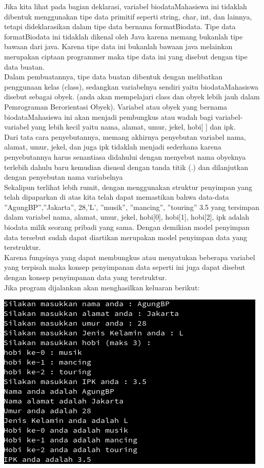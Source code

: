 \documentclass[a4paper,12pt]{article}
\begin{document}
Jika kita  lihat pada bagian deklarasi, variabel biodataMahasiswa ini tidaklah 
dibentuk menggunakan tipe data primitif seperti string, char, int, dan lainnya, tetapi  
dideklarasikan dalam tipe data bernama formatBiodata. Tipe data formatBiodata ini 
tidaklah dikenal oleh Java karena memang bukanlah tipe bawaan dari java. Karena tipe 
data ini bukanlah bawaan java melainkan merupakan ciptaan programmer maka tipe 
data ini yang disebut dengan tipe data buatan. \\
 
Dalam pembuatannya, tipe data buatan dibentuk dengan melibatkan 
penggunaan kelas (class), sedangkan variabelnya sendiri yaitu biodataMahasiswa 
disebut sebagai obyek. (anda akan mempelajari class dan obyek lebih jauh dalam 
Pemrograman Berorientasi Obyek). Variabel atau obyek yang bernama 
biodataMahasiswa ini akan menjadi pembungkus atau wadah bagi variabel-variabel 
yang lebih kecil yaitu nama, alamat, umur, jekel, hobi[ ] dan ipk.\\
Dari tata cara penyebutannya, memang akhirnya penyebutan variabel nama, 
alamat, umur, jekel, dan juga ipk tidaklah menjadi sederhana karena penyebutannya 
harus senantiasa didahului dengan menyebut nama obyeknya terlebih dahulu baru 
kemudian disusul dengan tanda titik (.) dan dilanjutkan dengan penyebutan nama variabelnya\\
Sekalipun terlihat lebih rumit, dengan menggunakan struktur penyimpan yang 
telah dipaparkan di atas kita telah dapat memastikan bahwa data-data 
”AgungBP”,”Jakarta”, 28,’L’, ”musik”, ”mancing”, ”touring” 
3.5  yang tersimpan dalam variabel nama, alamat, umur, jekel, 
hobi[0], hobi[1], hobi[2], ipk adalah biodata milik seorang pribadi yang 
sama. Dengan demikian model penyimpan data tersebut sudah dapat diartikan 
merupakan model penyimpan data yang terstruktur.\\ 
Karena fungsinya yang dapat membungkus atau menyatukan beberapa variabel 
yang terpisah maka konsep penyimpanan data seperti ini juga dapat disebut dengan konsep penyimpanan data yang
terstruktur.\\
Jika program dijalankan akan menghasilkan keluaran berikut:
\begin{center}
    \includegraphics[scale=1]{prog12.png} 
\end{center}
\end{document}
